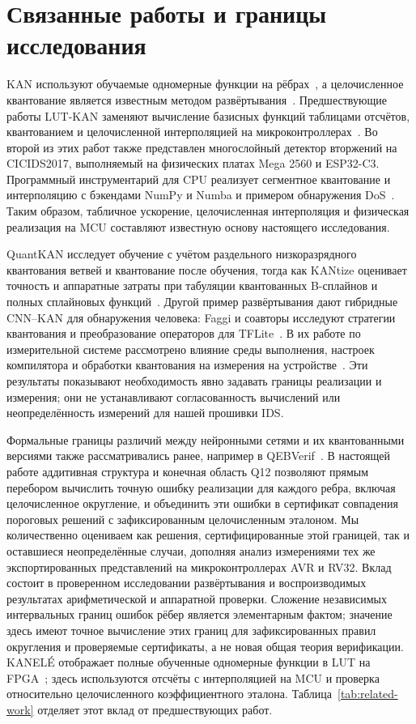 \section{Связанные работы и границы исследования}
KAN используют обучаемые одномерные функции на рёбрах~\cite{liu2024kan}, а целочисленное квантование является известным методом развёртывания~\cite{jacob2018integer}. Предшествующие работы LUT-KAN заменяют вычисление базисных функций таблицами отсчётов, квантованием и целочисленной интерполяцией на микроконтроллерах~\cite{kuznetsov2026esl,kuznetsov2026mculut}. Во второй из этих работ также представлен многослойный детектор вторжений на CICIDS2017, выполняемый на физических платах Mega 2560 и ESP32-C3. Программный инструментарий для CPU реализует сегментное квантование и интерполяцию с бэкендами NumPy и Numba и примером обнаружения DoS~\cite{kuznetsov2026toolkit}. Таким образом, табличное ускорение, целочисленная интерполяция и физическая реализация на MCU составляют известную основу настоящего исследования.

QuantKAN исследует обучение с учётом раздельного низкоразрядного квантования ветвей и квантование после обучения, тогда как KANtize оценивает точность и аппаратные затраты при табуляции квантованных B-сплайнов и полных сплайновых функций~\cite{fuad2025quantkan,errabii2026kantize}. Другой пример развёртывания дают гибридные CNN--KAN для обнаружения человека: Faggi и соавторы исследуют стратегии квантования и преобразование операторов для TFLite~\cite{faggi2026quantization}. В их работе по измерительной системе рассмотрено влияние среды выполнения, настроек компилятора и обработки квантования на измерения на устройстве~\cite{faggi2026sensor}. Эти результаты показывают необходимость явно задавать границы реализации и измерения; они не устанавливают согласованность вычислений или неопределённость измерений для нашей прошивки IDS.

Формальные границы различий между нейронными сетями и их квантованными версиями также рассматривались ранее, например в QEBVerif~\cite{zhang2023qebverif}. В настоящей работе аддитивная структура и конечная область Q12 позволяют прямым перебором вычислить точную ошибку реализации для каждого ребра, включая целочисленное округление, и объединить эти ошибки в сертификат совпадения пороговых решений с зафиксированным целочисленным эталоном. Мы количественно оцениваем как решения, сертифицированные этой границей, так и оставшиеся неопределённые случаи, дополняя анализ измерениями тех же экспортированных представлений на микроконтроллерах AVR и RV32. Вклад состоит в проверенном исследовании развёртывания и воспроизводимых результатах арифметической и аппаратной проверки. Сложение независимых интервальных границ ошибок рёбер является элементарным фактом; значение здесь имеют точное вычисление этих границ для зафиксированных правил округления и проверяемые сертификаты, а не новая общая теория верификации. KANEL\'{E} отображает полные обученные одномерные функции в LUT на FPGA~\cite{Hoang2025KANELE}; здесь используются отсчёты с интерполяцией на MCU и проверка относительно целочисленного коэффициентного эталона. Таблица~\ref{tab:related-work} отделяет этот вклад от предшествующих работ.


